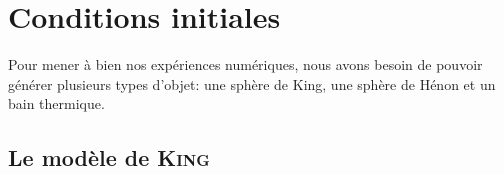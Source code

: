 




	\section{Conditions initiales}


		Pour mener à bien nos expériences numériques, nous avons besoin de pouvoir générer plusieurs types d'objet: %
		une sphère de King, une sphère de Hénon et un bain thermique.

		\subsection{Le modèle de \textsc{King}}

